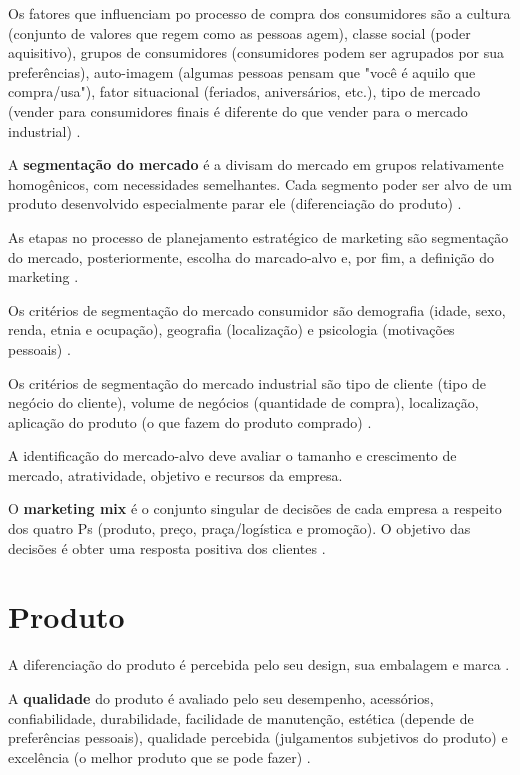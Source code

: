 Os fatores que influenciam po processo de compra dos consumidores são a cultura (conjunto de valores que regem como as pessoas agem), classe social (poder aquisitivo), grupos de consumidores (consumidores podem ser agrupados por sua preferências), auto-imagem (algumas pessoas pensam que "você é aquilo que compra/usa"), fator situacional (feriados, aniversários, etc.), tipo de mercado (vender para consumidores finais é diferente do que vender para o mercado industrial) \cite{maximiano}.


A \textbf{segmentação do mercado} é a divisam do mercado em grupos relativamente homogênicos, com necessidades semelhantes. Cada segmento poder ser alvo de um produto desenvolvido especialmente parar ele (diferenciação do produto) \cite{maximiano}.


As etapas no processo de planejamento estratégico de marketing são segmentação do mercado, posteriormente, escolha do marcado-alvo e, por fim, a definição do marketing \cite{maximiano}.


Os critérios de segmentação do mercado consumidor são demografia (idade, sexo, renda, etnia e ocupação), geografia (localização) e psicologia (motivações pessoais) \cite{maximiano}.


Os critérios de segmentação do mercado industrial são tipo de cliente (tipo de negócio do cliente), volume de negócios (quantidade de compra), localização, aplicação do produto (o que fazem do produto comprado) \cite{maximiano}.


A identificação do mercado-alvo deve avaliar o tamanho e crescimento de mercado, atratividade, objetivo e recursos da empresa.


O \textbf{marketing mix} é o conjunto singular de decisões de cada empresa a respeito dos quatro Ps (produto, preço, praça/logística e promoção). O objetivo das decisões é obter uma resposta positiva dos clientes \cite{maximiano}.


\section{Produto}

A diferenciação do produto é percebida pelo seu design, sua embalagem e marca \cite{maximiano}.


A \textbf{qualidade} do produto é avaliado pelo seu desempenho, acessórios, confiabilidade, durabilidade, facilidade de manutenção, estética (depende de preferências pessoais), qualidade percebida (julgamentos subjetivos do produto) e excelência (o melhor produto que se pode fazer) \cite{maximiano}.


